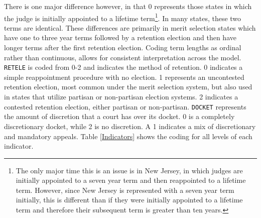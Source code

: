 \documentclass[JohnsonMADraft2.tex]{subfiles}
\begin{document}
There is one major difference however, in that 0 represents those states in which the judge is initially appointed to a lifetime term\footnote{The only major time this is an issue is in New Jersey, in which judges are initially appointed to a seven year term and then reappointed to a lifetime term.  However, since New Jersey is represented with a seven year term initially, this is different than if they were initially appointed to a lifetime term and therefore their subsequent term is greater than ten years.}.  In many states, these two terms are identical.  These differences are primarily in merit selection states which have one to three year terms followed by a retention election and then have longer terms after the first retention election.  Coding term lengths as ordinal rather than continuous, allows for consistent interpretation across the model.  \texttt{RETELE} is coded from 0-2 and indicates the method of retention.  0 indicates a simple reappointment procedure with no election.  1 represents an uncontested retention election, most common under the merit selection system, but also used in states that utilize partisan or non-partisan election systems.  2 indicates a contested retention election, either partisan or non-partisan.  \texttt{DOCKET} represents the amount of discretion that a court has over its docket.  0 is a completely discretionary docket, while 2 is no discretion.  A 1 indicates a mix of discretionary and mandatory appeals. Table \ref{Indicators} shows the coding for all levels of each indicator. 
\end{document}
